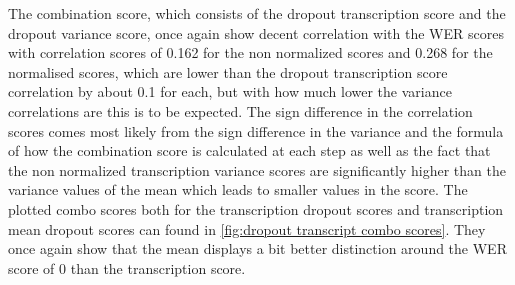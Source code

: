 The combination score, which consists of the dropout transcription score and the dropout variance score, once again show decent correlation with the WER scores with correlation scores of 0.162 for the non normalized scores and 0.268 for the normalised scores, which are lower than the dropout transcription score correlation by about 0.1 for each, but with how much lower the variance correlations are this is to be expected. The sign difference in the correlation scores comes most likely from the sign difference in the variance and the formula of how the combination score is calculated at each step as well as the fact that the non normalized transcription variance scores are significantly higher than the variance values of the mean which leads to smaller values in the score. 
The plotted combo scores both for the transcription dropout scores and transcription mean dropout scores can found in \autoref{fig:dropout transcript combo scores}. They once again show that the mean displays a bit better distinction around the WER score of 0 than the transcription score. 
